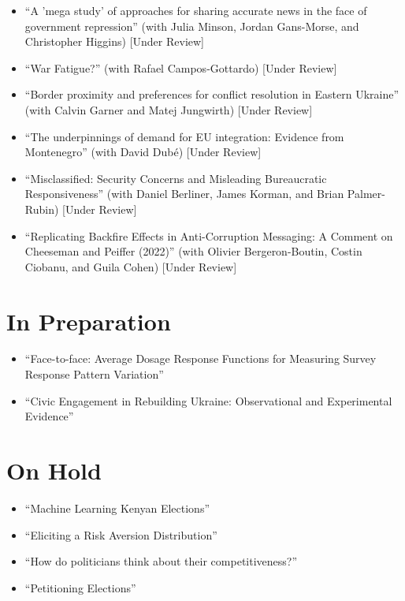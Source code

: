 \begin{itemize}[label={---},leftmargin=1.5em]
  \item ``A 'mega study' of approaches for sharing accurate news in the face of government repression'' (with Julia Minson, Jordan Gans-Morse, and Christopher Higgins) [Under Review]
  \item ``War Fatigue?'' (with Rafael Campos-Gottardo) [Under Review]
  \item ``Border proximity and preferences for conflict resolution in Eastern Ukraine'' (with Calvin Garner and Matej Jungwirth) [Under Review]
  \item ``The underpinnings of demand for EU integration: Evidence from Montenegro'' (with David Dubé) [Under Review]
  \item ``Misclassified: Security Concerns and Misleading Bureaucratic Responsiveness'' (with Daniel Berliner, James Korman, and Brian Palmer-Rubin) [Under Review]
  \item ``Replicating Backfire Effects in Anti-Corruption Messaging: A Comment on Cheeseman and Peiffer (2022)'' (with Olivier Bergeron-Boutin, Costin Ciobanu, and Guila Cohen) [Under Review]
\end{itemize}

\section{\sc In Preparation}

\begin{itemize}[label={---},leftmargin=1.5em]
  \item ``Face-to-face: Average Dosage Response Functions for Measuring Survey Response Pattern Variation''
  \item ``Civic Engagement in Rebuilding Ukraine: Observational and Experimental Evidence''
\end{itemize}

\section{\sc On Hold}

\begin{itemize}[label={---},leftmargin=1.5em]
  \item ``Machine Learning Kenyan Elections''
  \item ``Eliciting a Risk Aversion Distribution''
  \item ``How do politicians think about their competitiveness?''
  \item ``Petitioning Elections''
\end{itemize}


